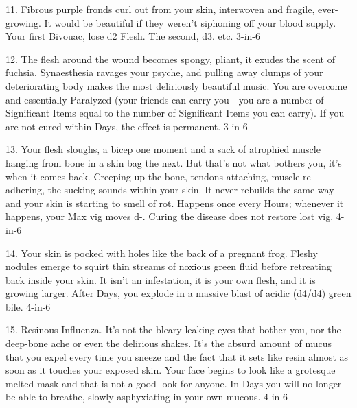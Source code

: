11. Fibrous purple fronds curl out from your skin, interwoven and fragile, ever-growing. It would be beautiful if they weren't siphoning off your blood supply.  Your first Bivouac, lose d2 Flesh.  The second, d3. etc.  3-in-6



12. The flesh around the wound becomes spongy, pliant, it exudes the scent of fuchsia. Synaesthesia ravages your psyche, and pulling away clumps of your deteriorating body makes the most deliriously beautiful music.  You are overcome and essentially Paralyzed (your friends can carry you - you are a number of Significant Items equal to the number of Significant Items you can carry).  If you are not cured within Days, the effect is permanent. 3-in-6








13. Your flesh sloughs, a bicep one moment and a sack of atrophied muscle hanging from bone in a skin bag the next. But that's not what bothers you, it's when it comes back. Creeping up the bone, tendons attaching, muscle re-adhering, the sucking sounds within your skin. It never rebuilds the same way and your skin is starting to smell of rot.  Happens once every Hours; whenever it happens, your Max {vig} moves {d-}.  Curing the disease does not restore lost {vig}. 4-in-6



14. Your skin is pocked with holes like the back of a pregnant frog. Fleshy nodules emerge to squirt thin streams of noxious green fluid before retreating back inside your skin. It isn't an infestation, it is your own flesh, and it is growing larger.  After Days, you explode in a massive blast of acidic (d4/d4) green bile. 4-in-6



15. Resinous Influenza. It's not the bleary leaking eyes that bother you, nor the deep-bone ache or even the delirious shakes. It's the absurd amount of mucus that you expel every time you sneeze and the fact that it sets like resin almost as soon as it touches your exposed skin. Your face begins to look like a grotesque melted mask and that is not a good look for anyone.  In Days you will no longer be able to breathe, slowly asphyxiating in your own mucous. 4-in-6



